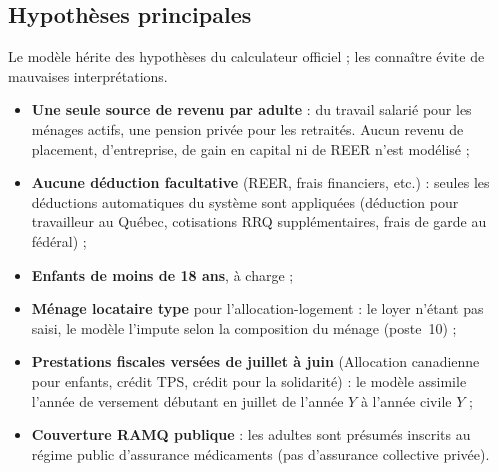 \subsection{Hypothèses principales}

Le modèle hérite des hypothèses du calculateur officiel ; les connaître évite
de mauvaises interprétations.

\begin{itemize}
  \item \textbf{Une seule source de revenu par adulte} : du travail salarié
        pour les ménages actifs, une pension privée pour les retraités.
        Aucun revenu de placement, d'entreprise, de gain en capital ni de
        REER n'est modélisé ;
  \item \textbf{Aucune déduction facultative} (REER, frais financiers,
        etc.) : seules les déductions automatiques du système sont
        appliquées (déduction pour travailleur au Québec, cotisations RRQ
        supplémentaires, frais de garde au fédéral) ;
  \item \textbf{Enfants de moins de 18 ans}, à charge ;
  \item \textbf{Ménage locataire type} pour l'allocation-logement : le loyer
        n'étant pas saisi, le modèle l'impute selon la composition du ménage
        (poste~10) ;
  \item \textbf{Prestations fiscales versées de juillet à juin} (Allocation
        canadienne pour enfants, crédit TPS, crédit pour la solidarité) :
        le modèle assimile l'année de versement débutant en juillet de
        l'année $Y$ à l'année civile $Y$ ;
  \item \textbf{Couverture RAMQ publique} : les adultes sont présumés
        inscrits au régime public d'assurance médicaments (pas d'assurance
        collective privée).
\end{itemize}
